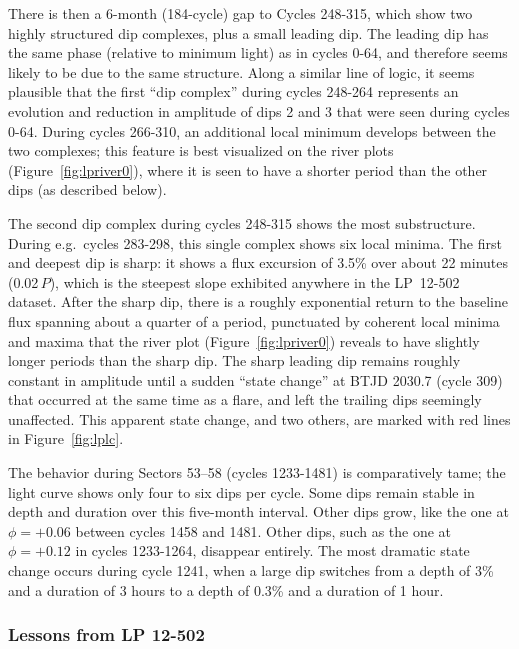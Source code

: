 \documentclass[11pt,twocolumn,tighten,linenumbers]{aastex63}
\begin{document}
There is then a 6-month (184-cycle) gap to Cycles 248-315, which show
two highly structured dip complexes, plus a small leading dip.  The
leading dip has the same phase (relative to minimum light) as in
cycles 0-64, and therefore seems likely to be due to the same
structure.  Along a similar line of logic, it seems plausible that the
first ``dip complex'' during cycles 248-264 represents an evolution
and reduction in amplitude of dips 2 and 3 that were seen during
cycles 0-64.  During cycles 266-310, an additional local minimum
develops between the two complexes; this feature is best visualized on
the river plots (Figure~\ref{fig:lpriver0}), where it is seen to have
a shorter period than the other dips (as described below).

The second dip complex during cycles 248-315 shows the most
substructure.  During e.g.~cycles 283-298, this single complex shows
six local minima.  The first and deepest dip is sharp: it shows a flux
excursion of 3.5\% over about 22 minutes (0.02\,$P$), which is the
steepest slope exhibited anywhere in the LP~12-502 dataset.  After the
sharp dip, there is a roughly exponential return to the baseline flux
spanning about a quarter of a period, punctuated by coherent local
minima and maxima that the river plot (Figure~\ref{fig:lpriver0})
reveals to have slightly longer periods than the sharp dip.  The sharp
leading dip remains roughly constant in amplitude until a sudden
``state change'' at BTJD 2030.7 (cycle 309) that occurred at the same
time as a flare, and left the trailing dips seemingly unaffected.
This apparent state change, and two others, are marked with red lines
in Figure~\ref{fig:lplc}.

The behavior during Sectors 53--58 (cycles 1233-1481) is comparatively
tame; the light curve shows only four to six dips per cycle.  Some
dips remain stable in depth and duration over this five-month
interval.  Other dips grow, like the one at $\phi = +0.06$ between
cycles 1458 and 1481.  Other dips, such as the one at $\phi = +0.12$
in cycles 1233-1264, disappear entirely.  The most dramatic state
change occurs during cycle 1241, when a large dip switches from a
depth of 3\% and a duration of 3 hours to a depth of 0.3\% and a
duration of 1 hour.


\subsubsection{Lessons from LP 12-502}
\label{subsec:lplessons}
\end{document}
